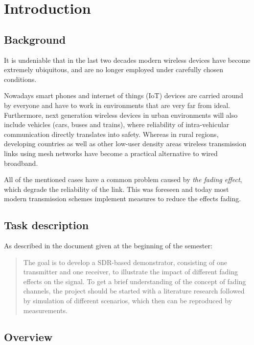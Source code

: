 
\chapter{Introduction}

\section{Background}

It is undeniable that in the last two decades modern wireless devices have become extremely ubiquitous, and are no longer employed under carefully chosen conditions.

Nowadays smart phones and internet of things (IoT) devices are carried around by everyone and have to work in environments that are very far from ideal. Furthermore, next generation wireless devices in urban environments will also include vehicles (cars, buses and trains)\cite{AntonescuTB17}, where reliability of intra-vehicular communication directly translates into safety. Whereas in rural regions, developing countries as well as other low-user density areas wireless transmission links using mesh networks have become a practical alternative to wired broadband\cite{Macmillan2019tidal,Subramanian2006rethinking,Flickenger2007wireless}.

All of the mentioned cases have a common problem caused by \emph{the fading effect}, which degrade the reliability of the link\cite{Mathis}. This was foreseen\cite{Frederiksen2002overview,Maddocks1993introduction} and today most modern transmission schemes implement measures to reduce the effects fading\cite{Mathis,Hsu}.

\section{Task description}

As described in the document given at the beginning of the semester:

\begin{quote}
	The goal is to develop a SDR-based demonstrator, consisting of one transmitter and one receiver, to illustrate the impact of different fading effects on the signal. To get a brief understanding of the concept of fading channels, the project should be started with a literature research followed by simulation of different scenarios, which then can be reproduced by measurements.
\end{quote}

\section{Overview}
